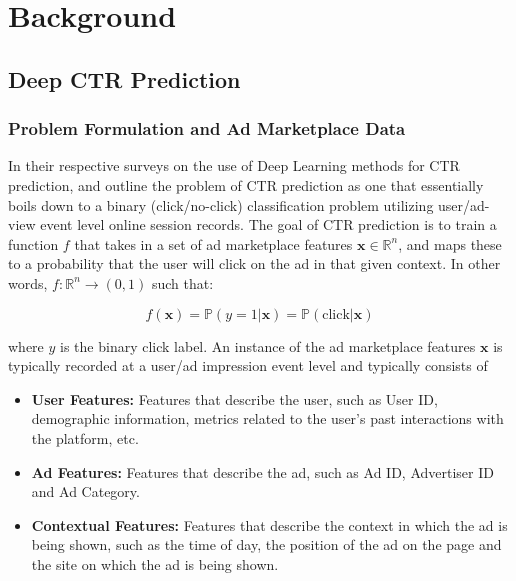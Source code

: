 \documentclass{mldsmsc}
\begin{document}
\chapter{Background}
\label{chap:background}

\section{Deep CTR Prediction}

\subsection{Problem Formulation and Ad Marketplace Data}

In their respective surveys on the use of Deep Learning methods for CTR prediction, \cite{RefWorks:gu2021ad} 
and \cite{RefWorks:zhang2021deep} outline the problem of CTR prediction as one that essentially boils down to
a binary (click/no-click) classification problem utilizing user/ad-view event level online session records. 
The goal of CTR prediction is to train a function $f$ that takes in a set of ad marketplace 
features $\mathbf{x} \in \mathbb{R}^n$, and maps these to a probability that the user 
will click on the ad in that given context. In other words, $f: \mathbb{R}^n \rightarrow (0,1)$ such that:

\begin{equation}
f(\mathbf{x}) = \mathbb{P}(y = 1 | \mathbf{x}) = \mathbb{P}(\text{click}| \mathbf{x})
\end{equation}

where $y$ is the binary click label. An instance of the ad marketplace features $\mathbf{x}$ is typically
recorded at a user/ad impression event level and typically consists of

\begin{itemize}
\item \textbf{User Features:} Features that describe the user, such as User ID, demographic information,
metrics related to the user's past interactions with the platform, etc.
\item \textbf{Ad Features:} Features that describe the ad, such as Ad ID, Advertiser ID and Ad Category.
\item \textbf{Contextual Features:} Features that describe the context in which the ad is being shown, such as
the time of day, the position of the ad on the page and the site on which the ad is being shown.
\end{itemize}
\end{document}
